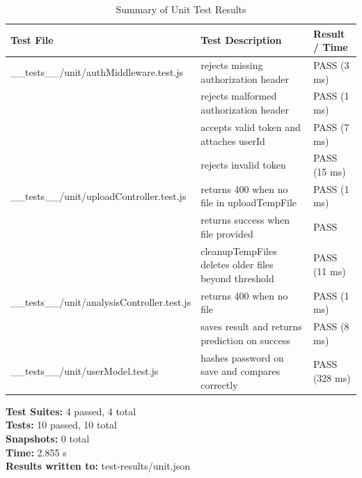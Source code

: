 \begin{table}[h!]
    \centering
    \caption{Summary of Unit Test Results}
    \begin{tabularx}{\textwidth}{lXl}
        \toprule
        \textbf{Test File}                            & \textbf{Test Description}                             & \textbf{Result / Time} \\
        \midrule
        \_\_tests\_\_/unit/authMiddleware.test.js     & rejects missing authorization header                  & PASS (3 ms)            \\
                                                      & rejects malformed authorization header                & PASS (1 ms)            \\
                                                      & accepts valid token and attaches userId               & PASS (7 ms)            \\
                                                      & rejects invalid token                                 & PASS (15 ms)           \\
        \midrule
        \_\_tests\_\_/unit/uploadController.test.js   & returns 400 when no file in uploadTempFile            & PASS (1 ms)            \\
                                                      & returns success when file provided                    & PASS                   \\
                                                      & cleanupTempFiles deletes older files beyond threshold & PASS (11 ms)           \\
        \midrule
        \_\_tests\_\_/unit/analysisController.test.js & returns 400 when no file                              & PASS (1 ms)            \\
                                                      & saves result and returns prediction on success        & PASS (8 ms)            \\
        \midrule
        \_\_tests\_\_/unit/userModel.test.js          & hashes password on save and compares correctly        & PASS (328 ms)          \\
        \bottomrule
    \end{tabularx}
\end{table}

\noindent\textbf{Test Suites:} 4 passed, 4 total \\
\textbf{Tests:} 10 passed, 10 total \\
\textbf{Snapshots:} 0 total \\
\textbf{Time:} 2.855 s \\
\textbf{Results written to:} test-results/unit.json


